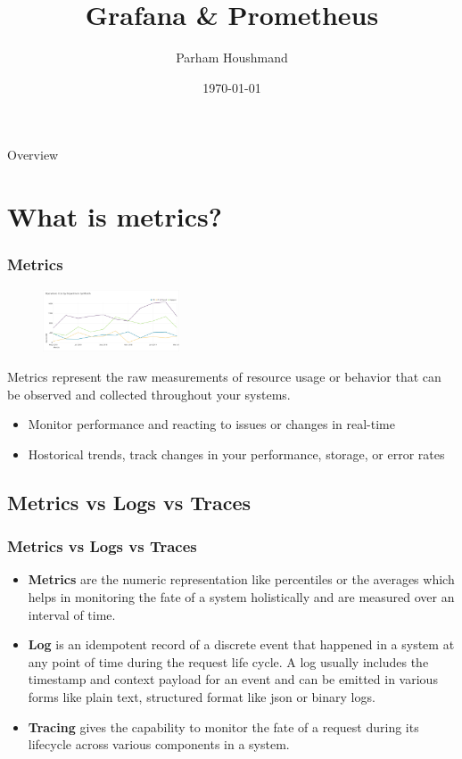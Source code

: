\documentclass[compress]{beamer}
\title{Grafana \& Prometheus}
\author{Parham Houshmand}
\institute{Carriot Inc.}
\date{\today}
\begin{document}
\frame{\titlepage}

\begin{frame}{Overview}

\tableofcontents

\end{frame}


\section{What is metrics?}

\begin{frame}

\frametitle{Metrics}

\begin{figure}
\centering
\includegraphics[height=70px]{./images/operationChart.png}
\end{figure}

Metrics represent the raw measurements of resource usage or behavior that can be observed and collected throughout your systems.

\begin{itemize}
\item Monitor performance and reacting to issues or changes in real-time
\item Hostorical trends, track changes in your performance, storage, or error rates
\end{itemize}

\end{frame}


\subsection{Metrics vs Logs vs Traces}
\begin{frame}

\frametitle{Metrics vs Logs vs Traces}

\begin{itemize}

\item \textbf{Metrics} are the numeric representation like percentiles or the averages which helps in monitoring the fate of a system holistically and are measured over an interval of time.

\item \textbf{Log} is an idempotent record of a discrete event that happened in a system at any point of time during the request life cycle. A log usually includes the timestamp and context payload for an event and can be emitted in various forms like plain text, structured format like json or binary logs.

\item \textbf{Tracing} gives the capability to monitor the fate of a request during its lifecycle across various components in a system.
\end{itemize}
\end{frame}
\end{document}
